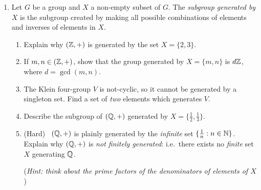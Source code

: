 \begin{exercises}
\begin{enumerate}
	\item\label{exs:finitegen} Let $G$ be a group and $X$ a non-empty subset of $G$. The \emph{subgroup generated by $X$} is the subgroup created by making all possible combinations of elements and inverses of elements in $X$.
	\begin{enumerate}
	  \item Explain why $(\mathbb{Z},+)$ is generated by the set $X=\{2,3\}$.
	  \item If $m,n\in(\mathbb{Z},+)$, show that the group generated by $X=\{m,n\}$ is $d\mathbb{Z}$, where $d=\gcd(m,n)$.
	  \item The Klein four-group $V$ is not-cyclic, so it cannot be generated by a singleton set. Find a set of \emph{two} elements which generates $V$.
	  \item Describe the subgroup of $(\mathbb{Q},+)$ generated by $X=\{\frac 12,\frac 13\}$.
	  \item (Hard) \ $(\mathbb{Q},+)$ is plainly generated by the \emph{infinite} set $\{\frac 1n:n\in\mathbb{N}\}$. Explain why $(\mathbb{Q},+)$ is \emph{not finitely generated}: i.e.\ there exists no \emph{finite} set $X$ generating $\mathbb{Q}$.\par
	  (\emph{Hint: think about the prime factors of the denominators of elements of $X$})
	\end{enumerate}
	

\end{enumerate}
\end{exercises}






